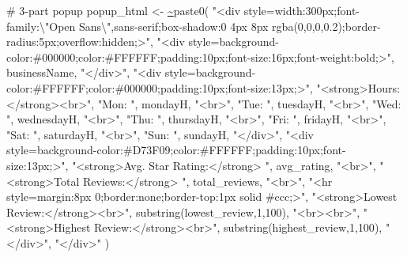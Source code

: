 \documentclass[
  12pt,
  letterpaper,
  DIV=11,
  numbers=noendperiod]{scrartcl}
\newenvironment{Shaded}{\begin{snugshade}}{\end{snugshade}}
\newcommand{\CommentTok}[1]{\textcolor[rgb]{0.42,0.45,0.49}{#1}}
\newcommand{\DecValTok}[1]{\textcolor[rgb]{0.47,0.72,1.00}{#1}}
\newcommand{\ErrorTok}[1]{\textcolor[rgb]{1.00,0.33,0.33}{\underline{#1}}}
\newcommand{\FunctionTok}[1]{\textcolor[rgb]{0.70,0.57,0.94}{#1}}
\newcommand{\NormalTok}[1]{\textcolor[rgb]{0.88,0.89,0.91}{#1}}
\newcommand{\OtherTok}[1]{\textcolor[rgb]{0.70,0.57,0.94}{#1}}
\newcommand{\SpecialCharTok}[1]{\textcolor[rgb]{0.47,0.72,1.00}{#1}}
\newcommand{\StringTok}[1]{\textcolor[rgb]{0.62,0.80,1.00}{#1}}
\begin{document}
\begin{Shaded}
\begin{Highlighting}[]
    \CommentTok{\# 3{-}part popup}
\NormalTok{    popup\_html }\OtherTok{\textless{}{-}} \ErrorTok{\textasciitilde{}}\FunctionTok{paste0}\NormalTok{(}
      \StringTok{"\textless{}div style=\textquotesingle{}width:300px;font{-}family:}\SpecialCharTok{\textbackslash{}"}\StringTok{Open Sans}\SpecialCharTok{\textbackslash{}"}\StringTok{,sans{-}serif;box{-}shadow:0 4px 8px rgba(0,0,0,0.2);border{-}radius:5px;overflow:hidden;\textquotesingle{}\textgreater{}"}\NormalTok{,}
      \StringTok{"\textless{}div style=\textquotesingle{}background{-}color:\#000000;color:\#FFFFFF;padding:10px;font{-}size:16px;font{-}weight:bold;\textquotesingle{}\textgreater{}"}\NormalTok{,}
\NormalTok{      businessName,}
      \StringTok{"\textless{}/div\textgreater{}"}\NormalTok{,}
      \StringTok{"\textless{}div style=\textquotesingle{}background{-}color:\#FFFFFF;color:\#000000;padding:10px;font{-}size:13px;\textquotesingle{}\textgreater{}"}\NormalTok{,}
      \StringTok{"\textless{}strong\textgreater{}Hours:\textless{}/strong\textgreater{}\textless{}br\textgreater{}"}\NormalTok{,}
      \StringTok{"Mon: "}\NormalTok{, mondayH, }\StringTok{"\textless{}br\textgreater{}"}\NormalTok{,}
      \StringTok{"Tue: "}\NormalTok{, tuesdayH, }\StringTok{"\textless{}br\textgreater{}"}\NormalTok{,}
      \StringTok{"Wed: "}\NormalTok{, wednesdayH, }\StringTok{"\textless{}br\textgreater{}"}\NormalTok{,}
      \StringTok{"Thu: "}\NormalTok{, thursdayH, }\StringTok{"\textless{}br\textgreater{}"}\NormalTok{,}
      \StringTok{"Fri: "}\NormalTok{, fridayH, }\StringTok{"\textless{}br\textgreater{}"}\NormalTok{,}
      \StringTok{"Sat: "}\NormalTok{, saturdayH, }\StringTok{"\textless{}br\textgreater{}"}\NormalTok{,}
      \StringTok{"Sun: "}\NormalTok{, sundayH,}
      \StringTok{"\textless{}/div\textgreater{}"}\NormalTok{,}
      \StringTok{"\textless{}div style=\textquotesingle{}background{-}color:\#D73F09;color:\#FFFFFF;padding:10px;font{-}size:13px;\textquotesingle{}\textgreater{}"}\NormalTok{,}
      \StringTok{"\textless{}strong\textgreater{}Avg. Star Rating:\textless{}/strong\textgreater{} "}\NormalTok{, avg\_rating, }\StringTok{"\textless{}br\textgreater{}"}\NormalTok{,}
      \StringTok{"\textless{}strong\textgreater{}Total Reviews:\textless{}/strong\textgreater{} "}\NormalTok{, total\_reviews, }\StringTok{"\textless{}br\textgreater{}"}\NormalTok{,}
      \StringTok{"\textless{}hr style=\textquotesingle{}margin:8px 0;border:none;border{-}top:1px solid \#ccc;\textquotesingle{}\textgreater{}"}\NormalTok{,}
      \StringTok{"\textless{}strong\textgreater{}Lowest Review:\textless{}/strong\textgreater{}\textless{}br\textgreater{}"}\NormalTok{,}
      \FunctionTok{substring}\NormalTok{(lowest\_review,}\DecValTok{1}\NormalTok{,}\DecValTok{100}\NormalTok{), }\StringTok{"\textless{}br\textgreater{}\textless{}br\textgreater{}"}\NormalTok{,}
      \StringTok{"\textless{}strong\textgreater{}Highest Review:\textless{}/strong\textgreater{}\textless{}br\textgreater{}"}\NormalTok{,}
      \FunctionTok{substring}\NormalTok{(highest\_review,}\DecValTok{1}\NormalTok{,}\DecValTok{100}\NormalTok{),}
      \StringTok{"\textless{}/div\textgreater{}"}\NormalTok{,}
      \StringTok{"\textless{}/div\textgreater{}"}
\NormalTok{    )}
    

\end{Highlighting}
\end{Shaded}
\end{document}
